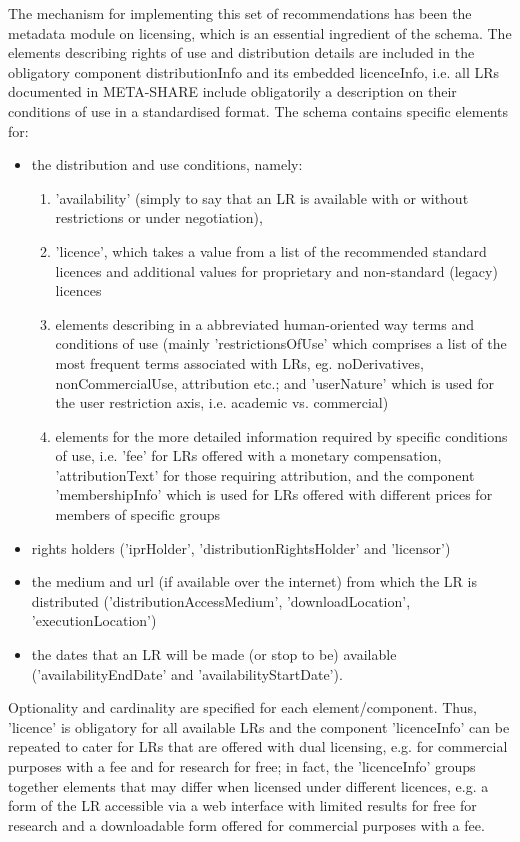 \documentclass{llncs}
\begin{document}
{The mechanism for implementing this set of recommendations has been the metadata module on licensing, which is an essential ingredient of the schema. The elements describing rights of use and distribution details are included in the obligatory component distributionInfo and its embedded licenceInfo, i.e. all LRs documented in META-SHARE include obligatorily a description on their conditions of use in a standardised format. The schema contains specific elements for:
\begin{itemize}
\item the distribution and use conditions, namely:
	\begin{enumerate}
	\item 'availability' (simply to say that an LR is available with or without restrictions or under negotiation), 
	\item 'licence', which takes a value from a list of the recommended standard licences and  additional values for proprietary and non-standard (legacy) licences
	\item elements describing in a abbreviated human-oriented way terms and conditions of use (mainly 'restrictionsOfUse' which comprises a list of the most frequent terms associated with LRs, eg. noDerivatives, nonCommercialUse, attribution etc.; and 'userNature' which is used for the user restriction axis, i.e. academic vs. commercial)
	\item elements for the more detailed information required by specific conditions of use, i.e. 'fee' for LRs offered with a monetary compensation, 'attributionText' for those requiring attribution, and the component  'membershipInfo' which is used for LRs offered with different prices for members of specific groups
	\end{enumerate}
\item rights holders ('iprHolder', 'distributionRightsHolder' and 'licensor')
\item the medium and url (if available over the internet) from which the LR is distributed ('distributionAccessMedium', 'downloadLocation', 'executionLocation')
\item the dates that an LR will be made (or stop to be) available ('availabilityEndDate' and 'availabilityStartDate').
\end{itemize}
Optionality and cardinality are specified for each element/component. Thus, 'licence' is obligatory for all available LRs and the component 'licenceInfo' can be repeated to cater for LRs that are offered with dual licensing, e.g. for commercial purposes with a fee and for research for free; in fact, the 'licenceInfo' groups together elements that may differ when licensed under different licences, e.g. a form of the LR accessible via a web interface with limited results for free for research and a downloadable form offered for commercial purposes with a fee.

}
\end{document}
